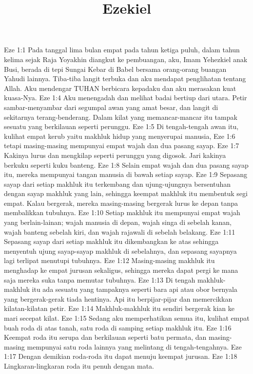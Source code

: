 

\title{Ezekiel}

Eze 1:1  Pada tanggal lima bulan empat pada tahun ketiga puluh, dalam tahun kelima sejak Raja Yoyakhin diangkut ke pembuangan, aku, Imam Yehezkiel anak Busi, berada di tepi Sungai Kebar di Babel bersama orang-orang buangan Yahudi lainnya. Tiba-tiba langit terbuka dan aku mendapat penglihatan tentang Allah. Aku mendengar TUHAN berbicara kepadaku dan aku merasakan kuat kuasa-Nya.
Eze 1:4  Aku menengadah dan melihat badai bertiup dari utara. Petir sambar-menyambar dari segumpal awan yang amat besar, dan langit di sekitarnya terang-benderang. Dalam kilat yang memancar-mancar itu tampak sesuatu yang berkilauan seperti perunggu.
Eze 1:5  Di tengah-tengah awan itu, kulihat empat kerub yaitu makhluk hidup yang menyerupai manusia,
Eze 1:6  tetapi masing-masing mempunyai empat wajah dan dua pasang sayap.
Eze 1:7  Kakinya lurus dan mengkilap seperti perunggu yang digosok. Jari kakinya berkuku seperti kuku banteng.
Eze 1:8  Selain empat wajah dan dua pasang sayap itu, mereka mempunyai tangan manusia di bawah setiap sayap.
Eze 1:9  Sepasang sayap dari setiap makhluk itu terkembang dan ujung-ujungnya bersentuhan dengan sayap makhluk yang lain, sehingga keempat makhluk itu membentuk segi empat. Kalau bergerak, mereka masing-masing bergerak lurus ke depan tanpa membalikkan tubuhnya.
Eze 1:10  Setiap makhluk itu mempunyai empat wajah yang berlain-lainan; wajah manusia di depan, wajah singa di sebelah kanan, wajah banteng sebelah kiri, dan wajah rajawali di sebelah belakang.
Eze 1:11  Sepasang sayap dari setiap makhluk itu dikembangkan ke atas sehingga menyentuh ujung sayap-sayap makhluk di sebelahnya, dan sepasang sayapnya lagi terlipat menutupi tubuhnya.
Eze 1:12  Masing-masing makhluk itu menghadap ke empat jurusan sekaligus, sehingga mereka dapat pergi ke mana saja mereka suka tanpa memutar tubuhnya.
Eze 1:13  Di tengah makhluk-makhluk itu ada sesuatu yang tampaknya seperti bara api atau obor bernyala yang bergerak-gerak tiada hentinya. Api itu berpijar-pijar dan memercikkan kilatan-kilatan petir.
Eze 1:14  Makhluk-makhluk itu sendiri bergerak kian ke mari secepat kilat.
Eze 1:15  Sedang aku memperhatikan semua itu, kulihat empat buah roda di atas tanah, satu roda di samping setiap makhluk itu.
Eze 1:16  Keempat roda itu serupa dan berkilauan seperti batu permata, dan masing-masing mempunyai satu roda lainnya yang melintang di tengah-tengahnya.
Eze 1:17  Dengan demikian roda-roda itu dapat menuju keempat jurusan.
Eze 1:18  Lingkaran-lingkaran roda itu penuh dengan mata.
